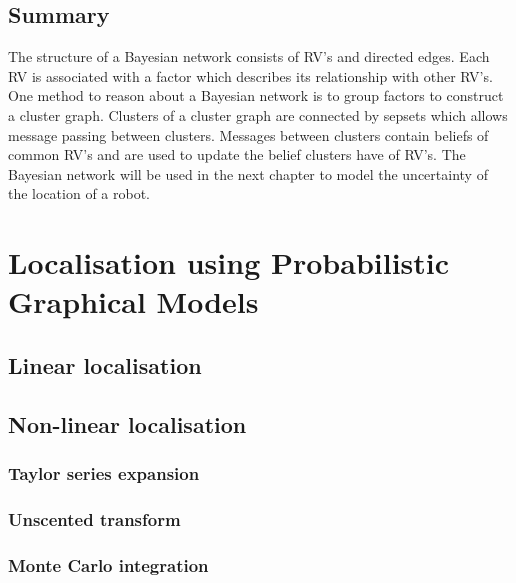 \documentclass[12pt,oneside,openany,a4paper, %
afrikaans,english,
]{memoir}
\numberwithin{equation}{chapter}
\begin{document}
\section{Summary}
The structure of a Bayesian network consists of RV's and directed edges. Each RV is associated with a factor which describes its relationship with other RV's. One method to reason about a Bayesian network is to group factors to construct a cluster graph. Clusters of a cluster graph are connected by sepsets which allows message passing between clusters. Messages between clusters contain beliefs of common RV's and are used to update the belief clusters have of RV's. The Bayesian network will be used in the next chapter to model the uncertainty of the location of a robot.
\chapter{Localisation using Probabilistic Graphical Models}
\section{Linear localisation}
\section{Non-linear localisation}
\subsection{Taylor series expansion}
\subsection{Unscented transform}
\subsection{Monte Carlo integration}

\backmatter
{}
\end{document}

